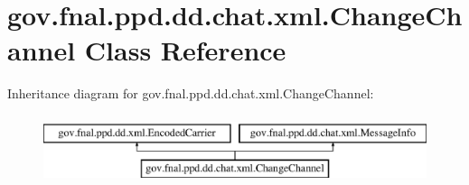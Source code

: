 \hypertarget{classgov_1_1fnal_1_1ppd_1_1dd_1_1chat_1_1xml_1_1ChangeChannel}{\section{gov.\-fnal.\-ppd.\-dd.\-chat.\-xml.\-Change\-Channel Class Reference}
\label{classgov_1_1fnal_1_1ppd_1_1dd_1_1chat_1_1xml_1_1ChangeChannel}
}
Inheritance diagram for gov.\-fnal.\-ppd.\-dd.\-chat.\-xml.\-Change\-Channel\-:\begin{figure}[H]
\begin{center}
\leavevmode
\includegraphics[height=2.000000cm]{classgov_1_1fnal_1_1ppd_1_1dd_1_1chat_1_1xml_1_1ChangeChannel}
\end{center}
\end{figure}
